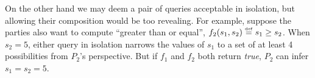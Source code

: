 \documentclass[10pt]{sigplanconf}
\begin{document}
On the other hand we may deem a pair of queries acceptable in
isolation, but allowing their composition would be too
revealing.  For example, suppose the parties also want to compute
``greater than or equal'', $f_2(s_1,s_2) \stackrel{\smash{\scriptscriptstyle \mathrm{def}}}= s_1 \geq s_2$. When $
s_2 = 5 $, either query in isolation narrows the values of $ s_1 $ to
a set of at least 4 possibilities from $ P_2 $'s perspective. But if $
f_1 $ and $ f_2 $ both return \emph{true}, $ P_2 $ can infer $ s_1 =
s_2 = 5 $.

 

\end{document}
